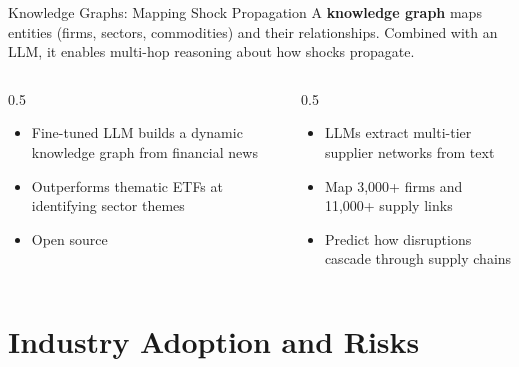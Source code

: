 \documentclass[aspectratio=169]{beamer}
\begin{document}
\begin{frame}{Knowledge Graphs: Mapping Shock Propagation}
A \textbf{knowledge graph} maps entities (firms, sectors, commodities) and their relationships. Combined with an LLM, it enables multi-hop reasoning about how shocks propagate.
\vspace{0.3cm}
\begin{columns}[T]
\begin{column}{0.5\textwidth}
\begin{shadedbox}[title=\textbf{FinDKG (Li et al., 2024)}]
\begin{itemize}\footnotesize
  \item Fine-tuned LLM builds a \alert{dynamic} knowledge graph from financial news
  \item Outperforms thematic ETFs at identifying sector themes
  \item Open source
\end{itemize}
\end{shadedbox}
\end{column}
\begin{column}{0.5\textwidth}
\begin{shadedbox}[title=\textbf{Supply Chain Mapping}]
\begin{itemize}\footnotesize
  \item LLMs extract multi-tier supplier networks from text
  \item Map 3,000+ firms and 11,000+ supply links
  \item Predict how disruptions cascade through supply chains
\end{itemize}
\end{shadedbox}
\end{column}
\end{columns}
\end{frame}

\section{Industry Adoption and Risks}
\end{document}
